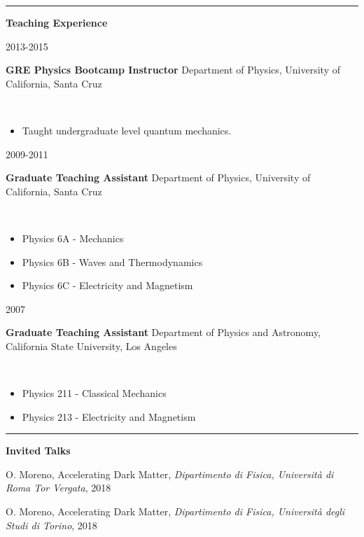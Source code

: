\documentclass[11pt]{article}
\newcommand{\cvsection}[1] {
    \noindent
    \textcolor{indigodye}{\rule{.15\textwidth}{.1in} \hspace{0.01 \textwidth} \textbf{\Large{#1}}} \newline 
}
\newcommand{\teachingentry}[4] { 
    \noindent
    \begin{minipage}[t]{0.15\textwidth} \begin{flushright} #1 \end{flushright} \end{minipage} \hspace{0.01\textwidth}
    \begin{minipage}[t]{0.84\textwidth}
        \textbf{#2} \newline
        #3  
    \end{minipage} \\[0.01pt]
    #4 \vspace{11pt}
}
\begin{document}
    \cvsection{Teaching Experience}
        \teachingentry{2013-2015}{GRE Physics Bootcamp Instructor}
                      {Department of Physics, University of California, Santa Cruz}
                      {
                        \begin{itemize}[label=\textcolor{indigodye}{$\circ$}, noitemsep, nolistsep, leftmargin=0.19\textwidth]
                            \item Taught undergraduate level quantum mechanics.                                 
                          \end{itemize}
                      }

        \teachingentry{2009-2011}{Graduate Teaching Assistant}
                      {Department of Physics, University of California, Santa Cruz}
                      {
                        \begin{itemize}[label=\textcolor{indigodye}{$\circ$}, noitemsep, nolistsep, leftmargin=0.19\textwidth]
                            \item Physics 6A - Mechanics                                 
                            \item Physics 6B - Waves and Thermodynamics                  
                            \item Physics 6C - Electricity and Magnetism                
                          \end{itemize}
                      }

        \teachingentry{2007}{Graduate Teaching Assistant}
                      {Department of Physics and Astronomy, California State University, Los Angeles}
                      {  
                        \begin{itemize}[label=\textcolor{indigodye}{$\circ$}, noitemsep, nolistsep, leftmargin=0.19\textwidth]
                            \item Physics 211 - Classical Mechanics                      
                            \item Physics 213 - Electricity and Magnetism 
                        \end{itemize}
                      }
    
    \cvsection{Invited Talks}

    \noindent
    [1] O. Moreno, Accelerating Dark Matter,
        \emph{Dipartimento di Fisica, Università di Roma Tor Vergata}, 2018 
    
    \noindent
    [2] O. Moreno, Accelerating Dark Matter,
        \emph{Dipartimento di Fisica, Università degli Studi di Torino}, 2018 
    
\end{document}
